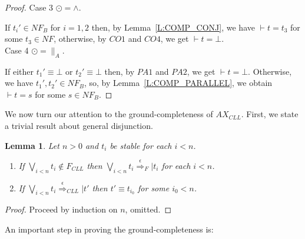 \documentclass{elsarticle}
\theoremstyle{plain}
\newtheorem{lemma}[theorem]{Lemma}
\theoremstyle{definition}
\begin{document}
\begin{proof}
\noindent Case 3 $\odot = \wedge$.

         If $t_i'\in NF_B$ for $i=1,2$ then, by Lemma~\ref{L:COMP_CONJ}, we have $\vdash t = t_3$ for some $t_3 \in NF$, otherwise, by $CO1$ and $CO4$, we get $\vdash t = \bot$.\\

\noindent Case 4 $\odot = \parallel_A$.

        If either $t_1' \equiv \bot$ or $t_2' \equiv \bot$ then, by $PA1$ and $PA2$, we get $\vdash t = \bot$.
        Otherwise,  we have $t_1',t_2' \in NF_B$, so, by Lemma~\ref{L:COMP_PARALLEL}, we obtain $\vdash  t= s$ for some $s \in NF_B$.
\end{proof}

We now turn our attention to the ground-completeness of $AX_{CLL}$.
First, we state a trivial result about general disjunction.

\begin{lemma}\label{L:SUBSTRUCTURE}
  Let $n>0$ and $t_i$ be stable for each $i< n$.
  \begin{enumerate}
    \item If $\underset{i< n}{\bigvee}t_i \notin F_{{CLL}}$ then $\underset{i< n}{\bigvee}t_i \stackrel{\epsilon}{\Longrightarrow}_F| t_{i}$ for each $i < n$.
    \item If $\underset{i< n}{\bigvee}t_i \stackrel{\epsilon}{\Longrightarrow}_{CLL}| t'$ then $t'\equiv t_{i_0}$ for some $i_0 < n$.
  \end{enumerate}
\end{lemma}
\begin{proof}
Proceed by induction on $n$, omitted.
\end{proof}

An important step in proving the ground-completeness is:
\end{document}
